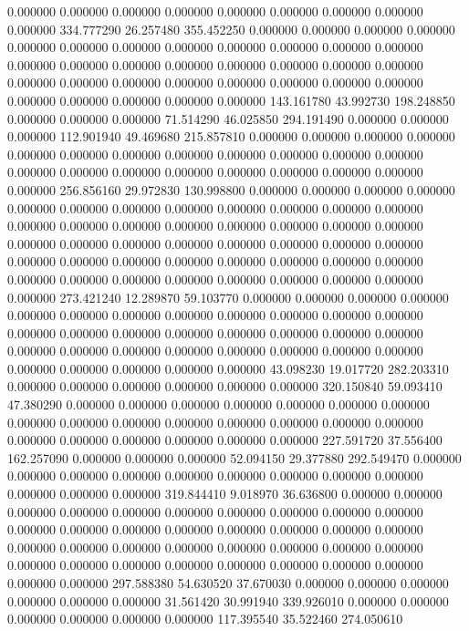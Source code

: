 0.000000 0.000000 0.000000
0.000000 0.000000 0.000000
0.000000 0.000000 0.000000
334.777290 26.257480 355.452250
0.000000 0.000000 0.000000
0.000000 0.000000 0.000000
0.000000 0.000000 0.000000
0.000000 0.000000 0.000000
0.000000 0.000000 0.000000
0.000000 0.000000 0.000000
0.000000 0.000000 0.000000
0.000000 0.000000 0.000000
0.000000 0.000000 0.000000
0.000000 0.000000 0.000000
0.000000 0.000000 0.000000
143.161780 43.992730 198.248850
0.000000 0.000000 0.000000
71.514290 46.025850 294.191490
0.000000 0.000000 0.000000
112.901940 49.469680 215.857810
0.000000 0.000000 0.000000
0.000000 0.000000 0.000000
0.000000 0.000000 0.000000
0.000000 0.000000 0.000000
0.000000 0.000000 0.000000
0.000000 0.000000 0.000000
0.000000 0.000000 0.000000
256.856160 29.972830 130.998800
0.000000 0.000000 0.000000
0.000000 0.000000 0.000000
0.000000 0.000000 0.000000
0.000000 0.000000 0.000000
0.000000 0.000000 0.000000
0.000000 0.000000 0.000000
0.000000 0.000000 0.000000
0.000000 0.000000 0.000000
0.000000 0.000000 0.000000
0.000000 0.000000 0.000000
0.000000 0.000000 0.000000
0.000000 0.000000 0.000000
0.000000 0.000000 0.000000
0.000000 0.000000 0.000000
0.000000 0.000000 0.000000
273.421240 12.289870 59.103770
0.000000 0.000000 0.000000
0.000000 0.000000 0.000000
0.000000 0.000000 0.000000
0.000000 0.000000 0.000000
0.000000 0.000000 0.000000
0.000000 0.000000 0.000000
0.000000 0.000000 0.000000
0.000000 0.000000 0.000000
0.000000 0.000000 0.000000
0.000000 0.000000 0.000000
0.000000 0.000000 0.000000
43.098230 19.017720 282.203310
0.000000 0.000000 0.000000
0.000000 0.000000 0.000000
320.150840 59.093410 47.380290
0.000000 0.000000 0.000000
0.000000 0.000000 0.000000
0.000000 0.000000 0.000000
0.000000 0.000000 0.000000
0.000000 0.000000 0.000000
0.000000 0.000000 0.000000
0.000000 0.000000 0.000000
227.591720 37.556400 162.257090
0.000000 0.000000 0.000000
52.094150 29.377880 292.549470
0.000000 0.000000 0.000000
0.000000 0.000000 0.000000
0.000000 0.000000 0.000000
0.000000 0.000000 0.000000
319.844410 9.018970 36.636800
0.000000 0.000000 0.000000
0.000000 0.000000 0.000000
0.000000 0.000000 0.000000
0.000000 0.000000 0.000000
0.000000 0.000000 0.000000
0.000000 0.000000 0.000000
0.000000 0.000000 0.000000
0.000000 0.000000 0.000000
0.000000 0.000000 0.000000
0.000000 0.000000 0.000000
0.000000 0.000000 0.000000
0.000000 0.000000 0.000000
297.588380 54.630520 37.670030
0.000000 0.000000 0.000000
0.000000 0.000000 0.000000
31.561420 30.991940 339.926010
0.000000 0.000000 0.000000
0.000000 0.000000 0.000000
117.395540 35.522460 274.050610
